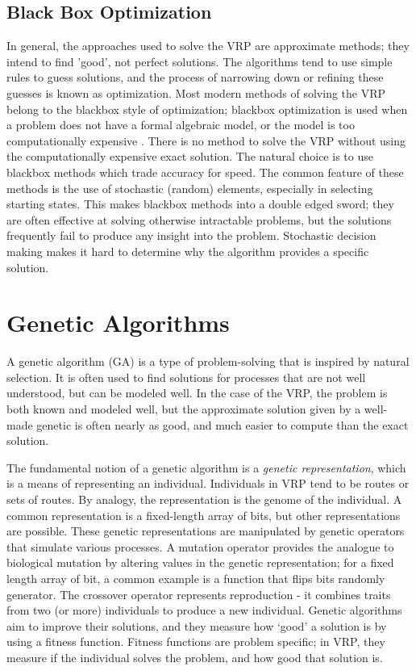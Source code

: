 \documentclass{sig-alternate}
\begin{document}
\subsection{Black Box Optimization}
In general, the approaches used to solve the VRP are approximate methods; they intend to find 'good', not perfect solutions. The algorithms tend to use simple rules to guess solutions, and the process of narrowing down or refining these guesses is known as optimization. Most modern methods of solving the VRP belong to the blackbox style of optimization; blackbox optimization is used when a problem does not have a formal algebraic model, or the model is too computationally expensive \cite{Amaran:2014}. There is no method to solve the VRP without using the computationally expensive exact solution. The natural choice is to use blackbox methods which trade accuracy for speed. The common feature of these methods is the use of stochastic (random) elements, especially in selecting starting states. This makes blackbox methods into a double edged sword; they are often effective at solving otherwise intractable problems, but the solutions frequently fail to produce any insight into the problem. Stochastic decision making makes it hard to determine why the algorithm provides a specific solution. 

\section{Genetic Algorithms}
A genetic algorithm (GA) is a type of problem-solving that is inspired by natural selection. It is often used to find solutions for processes that are not well understood, but can be modeled well. In the case of the VRP, the problem is both known and modeled well, but the approximate solution given by a well-made genetic is often nearly as good, and much easier to compute than the exact solution. 

The fundamental notion of a genetic algorithm is a \textit{genetic representation}, which is a means of representing an individual. Individuals in VRP tend to be routes or sets of routes. By analogy, the representation is the genome of the individual.  A common representation is a fixed-length array of bits, but other representations are possible. These genetic representations are manipulated by genetic operators that simulate various processes. A mutation operator provides the analogue to biological mutation by altering values in the genetic representation; for a fixed length array of bit, a common example is a function that flips bits randomly generator. The crossover operator represents reproduction - it combines traits from two (or more) individuals to produce a new individual. 
Genetic algorithms aim to improve their solutions, and they measure how `good' a solution is by using a fitness function. Fitness functions are problem specific; in VRP, they measure if the individual solves the problem, and how good that solution is.
\end{document}
